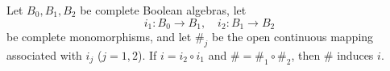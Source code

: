 Let $B_0, B_1, B_2$ be complete Boolean algebras, let
$$i_1: B_0 \rightarrow B_1, \quad i_2: B_1 \rightarrow B_2$$
be complete monomorphisms, and let $\#_j$ be the open continuous mapping associated with $i_j$ ($j = 1, 2$). If $i = i_2 \circ i_1$ and $\# = \#_1 \circ \#_2$, then $\#$ induces $i$.
